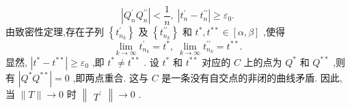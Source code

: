\[
\left| {{Q}_{n}^{\prime }{Q}_{n}^{\prime \prime }}\right|  < \frac{1}{n},\;\left| {{t}_{n}^{\prime } - {t}_{n}^{\prime \prime }}\right|  \geq  {\varepsilon }_{0}.
\]
由致密性定理,存在子列 \(\left\{  {t}_{{n}_{k}}^{\prime }\right\}\) 及 \(\left\{  {t}_{{n}_{k}}^{\prime \prime }\right\}\) 和 \({t}^{ * },{t}^{* * } \in  \left\lbrack  {\alpha ,\beta }\right\rbrack\) ,使得
\[
\mathop{\lim }\limits_{{k \rightarrow  \infty }}{t}_{{n}_{k}}^{\prime } = {t}^{ * },\;\mathop{\lim }\limits_{{k \rightarrow  \infty }}{t}_{{n}_{k}}^{\prime \prime } = {t}^{* * }.
\]
显然, \(\left| {{t}^{ * } - {t}^{* * }}\right|  \geq  {\varepsilon }_{0}\) ,即 \({t}^{ * } \neq  {t}^{* * }\) . 设 \({t}^{ * }\) 和 \({t}^{* * }\) 对应的 \(C\) 上的点为 \({Q}^{ * }\) 和 \({Q}^{* * }\) ,则有 \(\left| {{Q}^{ * }{Q}^{* * }}\right|  = 0\) ,即两点重合. 这与 \(C\) 是一条没有自交点的非闭的曲线矛盾. 因此,当 \(\parallel T\parallel  \rightarrow  0\) 时 \(\begin{Vmatrix}{T}^{\prime }\end{Vmatrix} \rightarrow  0\) .

